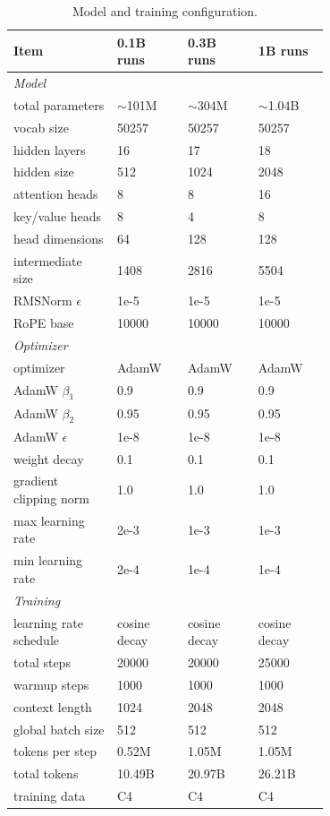 \documentclass{article}
\theoremstyle{plain}
\theoremstyle{definition}
\theoremstyle{remark}
\begin{document}
\begin{table}[ht]
	\centering
	\caption{Model and training configuration.}\label{tab:config}
	\begin{tabular}{p{0.25\linewidth}p{0.15\linewidth}p{0.15\linewidth}p{0.15\linewidth}}
		\toprule
		Item & 0.1B runs & 0.3B runs & 1B runs \\
		\midrule
		\emph{Model} & & & \\
		total parameters & $\sim$101M & $\sim$304M & $\sim$1.04B \\
		vocab size & 50257 & 50257 & 50257 \\
		hidden layers & 16 & 17 & 18 \\
		hidden size & 512 & 1024 & 2048 \\
		attention heads & 8 & 8 & 16 \\
		key/value heads & 8 & 4 & 8 \\
		head dimensions & 64 & 128 & 128 \\
		intermediate size & 1408 & 2816 & 5504 \\
		RMSNorm $\epsilon$ & 1e-5 & 1e-5 & 1e-5 \\
		RoPE base & 10000 & 10000 & 10000 \\
		\midrule
		\emph{Optimizer} & & & \\
		optimizer & AdamW & AdamW & AdamW \\
		AdamW $\beta_1$ & 0.9 & 0.9 & 0.9 \\
		AdamW $\beta_2$ & 0.95 & 0.95 & 0.95 \\
		AdamW $\epsilon$ & 1e-8 & 1e-8 & 1e-8 \\
		weight decay & 0.1 & 0.1 & 0.1 \\
		gradient clipping norm & 1.0 & 1.0 & 1.0 \\
		max learning rate & 2e-3 & 1e-3 & 1e-3 \\
		min learning rate & 2e-4 & 1e-4 & 1e-4 \\
		\midrule
		\emph{Training} & & & \\
		learning rate schedule & cosine decay & cosine decay & cosine decay \\
		total steps & 20000 & 20000 & 25000 \\
		warmup steps & 1000 & 1000 & 1000 \\
		context length & 1024 & 2048 & 2048 \\
		global batch size & 512 & 512 & 512 \\
		tokens per step & 0.52M & 1.05M & 1.05M \\
		total tokens & 10.49B & 20.97B & 26.21B \\
		training data & C4 & C4 & C4 \\
		\bottomrule
	\end{tabular}
\end{table}
\end{document}
